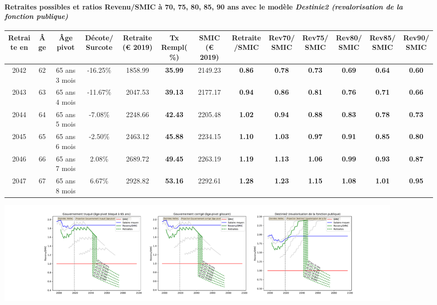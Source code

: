 \paragraph{Retraites possibles et ratios Revenu/SMIC à 70, 75, 80, 85, 90 ans avec le modèle \emph{Destinie2 (revalorisation de la fonction publique)}}  
 
{ \scriptsize \begin{center} 
\begin{tabular}[htb]{|c|c||c|c||c|c||c||c|c|c|c|c|c|} 
\hline 
 Retraite en &  Âge &  Âge pivot &  Décote/Surcote &  Retraite (\euro{} 2019) &  Tx Rempl(\%) &  SMIC (\euro{} 2019) &  Retraite/SMIC &  Rev70/SMIC &  Rev75/SMIC &  Rev80/SMIC &  Rev85/SMIC &  Rev90/SMIC \\ 
\hline \hline 
 2042 &  62 &  65 ans 3 mois &  -16.25\% &  1858.99 &  {\bf 35.99} &  2149.23 &  {\bf {\color{red} 0.86}} &  {\bf {\color{red} 0.78}} &  {\bf {\color{red} 0.73}} &  {\bf {\color{red} 0.69}} &  {\bf {\color{red} 0.64}} &  {\bf {\color{red} 0.60}} \\ 
\hline 
 2043 &  63 &  65 ans 4 mois &  -11.67\% &  2047.53 &  {\bf 39.13} &  2177.17 &  {\bf {\color{red} 0.94}} &  {\bf {\color{red} 0.86}} &  {\bf {\color{red} 0.81}} &  {\bf {\color{red} 0.76}} &  {\bf {\color{red} 0.71}} &  {\bf {\color{red} 0.66}} \\ 
\hline 
 2044 &  64 &  65 ans 5 mois &  -7.08\% &  2248.66 &  {\bf 42.43} &  2205.48 &  {\bf 1.02} &  {\bf {\color{red} 0.94}} &  {\bf {\color{red} 0.88}} &  {\bf {\color{red} 0.83}} &  {\bf {\color{red} 0.78}} &  {\bf {\color{red} 0.73}} \\ 
\hline 
 2045 &  65 &  65 ans 6 mois &  -2.50\% &  2463.12 &  {\bf 45.88} &  2234.15 &  {\bf 1.10} &  {\bf 1.03} &  {\bf {\color{red} 0.97}} &  {\bf {\color{red} 0.91}} &  {\bf {\color{red} 0.85}} &  {\bf {\color{red} 0.80}} \\ 
\hline 
 2046 &  66 &  65 ans 7 mois &  2.08\% &  2689.72 &  {\bf 49.45} &  2263.19 &  {\bf 1.19} &  {\bf 1.13} &  {\bf 1.06} &  {\bf {\color{red} 0.99}} &  {\bf {\color{red} 0.93}} &  {\bf {\color{red} 0.87}} \\ 
\hline 
 2047 &  67 &  65 ans 8 mois &  6.67\% &  2928.82 &  {\bf 53.16} &  2292.61 &  {\bf 1.28} &  {\bf 1.23} &  {\bf 1.15} &  {\bf 1.08} &  {\bf 1.01} &  {\bf {\color{red} 0.95}} \\ 
\hline 
\hline 
\end{tabular} 
\end{center} } 

 \begin{center}\includegraphics[width=0.9\textwidth]{fig/Infirmier_1980_22_dest_retraite.pdf}\end{center} \label{fig/Infirmier_1980_22_dest_retraite.pdf} 

